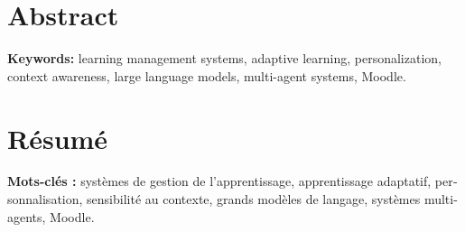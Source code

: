 \chapter*{Abstract}
\thispagestyle{plain}

\noindent\textbf{Keywords:} learning management systems, adaptive
learning, personalization, context awareness, large language models,
multi-agent systems, Moodle.

\chapter*{Résumé}
\thispagestyle{plain}
\begin{otherlanguage}{french}

\noindent\textbf{Mots-clés :} systèmes de gestion de l'apprentissage,
apprentissage adaptatif, personnalisation, sensibilité au contexte,
grands modèles de langage, systèmes multi-agents, Moodle.
\end{otherlanguage}

